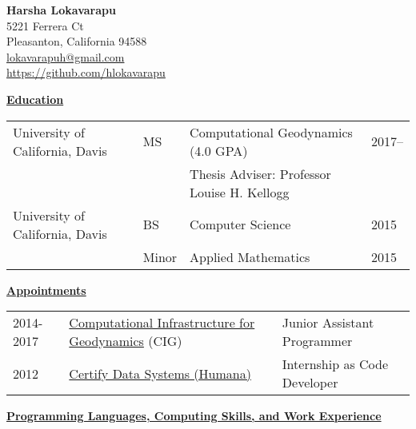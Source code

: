 \documentclass[11pt]{ltxdoc}
\begin{document}
\begin{center}
  \textbf{Harsha Lokavarapu}                                            \\ [06pt]
  5221 Ferrera Ct                                                       \\
  Pleasanton, California 94588                                          \\
 \href{mailto:lokavarapuh@gmail.com}{lokavarapuh@gmail.com}             \\
  \href{https://github.com/hlokavarapu}{https://github.com/hlokavarapu} \\ [3pt]
\end{center}


\vskip 12pt

\begin{center}
	\textbf{\underline{Education}}
\end{center}

\vskip -06pt

\begin{tabular}{llll}
University of California, Davis              &MS       &Computational Geodynamics (4.0 GPA)      & 2017-- \\
                                             &       &Thesis Adviser: Professor Louise H. Kellogg           &  \\
University of California, Davis              &BS      & Computer Science                         & 2015       \\
                                             &Minor   & Applied Mathematics                      & 2015
\end{tabular}

\vskip 18pt

\begin{center}
	\textbf{\underline{Appointments}}
\end{center}

\begin{tabular}{lll}
2014-2017     & \href{https://geodynamics.org/cig/}{Computational Infrastructure for Geodynamics} (CIG) & Junior Assistant Programmer \\
2012       & \href{https://www.humana.com}{Certify Data Systems (Humana)} & Internship as Code Developer
\end{tabular}

\vskip 18pt

\begin{center}
	\textbf{\underline{Programming Languages, Computing Skills, and Work Experience}}
\end{center}
\end{document}
